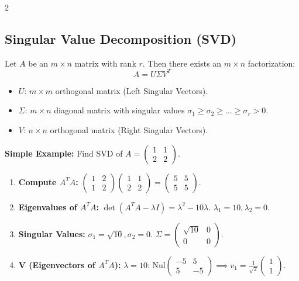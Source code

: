 \documentclass[10pt, letterpaper]{article}
\begin{document}
\begin{multicols*}{2}
\subsection{Singular Value Decomposition (SVD)}
Let $A$ be an $m \times n$ matrix with rank $r$. Then there exists an $m \times n$ factorization:
$$ A = U \Sigma V^T $$
\begin{itemize}
    \item $U$: $m \times m$ orthogonal matrix (Left Singular Vectors).
    \item $\Sigma$: $m \times n$ diagonal matrix with singular values $\sigma_1 \ge \sigma_2 \ge \dots \ge \sigma_r > 0$.
    \item $V$: $n \times n$ orthogonal matrix (Right Singular Vectors).
\end{itemize}
\textbf{Simple Example:} Find SVD of $A = \begin{pmatrix} 1 & 1 \\ 2 & 2 \end{pmatrix}$.
\begin{enumerate}
    \item \textbf{Compute $A^T A$:} $\begin{pmatrix} 1 & 2 \\ 1 & 2 \end{pmatrix} \begin{pmatrix} 1 & 1 \\ 2 & 2 \end{pmatrix} = \begin{pmatrix} 5 & 5 \\ 5 & 5 \end{pmatrix}$.
    \item \textbf{Eigenvalues of $A^T A$:} $\det(A^T A - \lambda I) = \lambda^2 - 10\lambda$. $\lambda_1 = 10, \lambda_2 = 0$.
    \item \textbf{Singular Values:} $\sigma_1 = \sqrt{10}, \sigma_2 = 0$. $\Sigma = \begin{pmatrix} \sqrt{10} & 0 \\ 0 & 0 \end{pmatrix}$.
    \item \textbf{V (Eigenvectors of $A^T A$):}
    $\lambda=10$: $\text{Nul}\begin{pmatrix} -5 & 5 \\ 5 & -5 \end{pmatrix} \implies v_1 = \frac{1}{\sqrt{2}}\begin{pmatrix} 1 \\ 1 \end{pmatrix}$.

\end{enumerate}
\end{multicols*}
\end{document}
